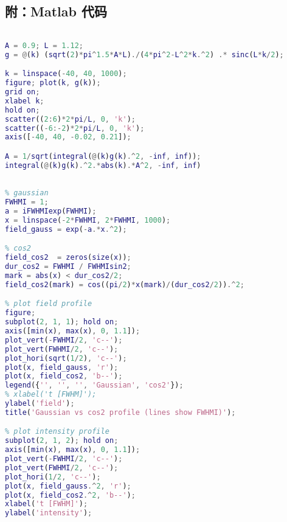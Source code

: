 \subsection{附：Matlab 代码}
\begin{lstlisting}[language=matlab, caption=cos2\_spec.m]
% properties of cos2 wave packet spectra

A = 0.9; L = 1.12;
g = @(k) (sqrt(2)*pi^1.5*A*L)./(4*pi^2-L^2*k.^2) .* sinc(L*k/2);

k = linspace(-40, 40, 1000);
figure; plot(k, g(k));
grid on;
xlabel k;
hold on;
scatter((2:6)*2*pi/L, 0, 'k');
scatter((-6:-2)*2*pi/L, 0, 'k');
axis([-40, 40, -0.02, 0.21]);

A = 1/sqrt(integral(@(k)g(k).^2, -inf, inf));
integral(@(k)g(k).^2.*abs(k).*A^2, -inf, inf)

\end{lstlisting}

\begin{lstlisting}[language=matlab, caption=sin2\_gaussian\_compare.m]
% plot Gaussian vs cos2 profile

% gaussian
FWHMI = 1;
a = iFWHMIexp(FWHMI);
x = linspace(-2*FWHMI, 2*FWHMI, 1000);
field_gauss = exp(-a.*x.^2);

% cos2
field_cos2  = zeros(size(x));
dur_cos2 = FWHMI / FWHMIsin2;
mark = abs(x) < dur_cos2/2;
field_cos2(mark) = cos((pi/2)*x(mark)/(dur_cos2/2)).^2;

% plot field profile
figure;
subplot(2, 1, 1); hold on;
axis([min(x), max(x), 0, 1.1]);
plot_vert(-FWHMI/2, 'c--');
plot_vert(FWHMI/2, 'c--');
plot_hori(sqrt(1/2), 'c--');
plot(x, field_gauss, 'r');
plot(x, field_cos2, 'b--');
legend({'', '', '', 'Gaussian', 'cos2'});
% xlabel('t [FWHM]');
ylabel('field');
title('Gaussian vs cos2 profile (lines show FWHMI)');

% plot intensity profile
subplot(2, 1, 2); hold on;
axis([min(x), max(x), 0, 1.1]);
plot_vert(-FWHMI/2, 'c--');
plot_vert(FWHMI/2, 'c--');
plot_hori(1/2, 'c--');
plot(x, field_gauss.^2, 'r');
plot(x, field_cos2.^2, 'b--');
xlabel('t [FWHM]');
ylabel('intensity');
\end{lstlisting}

